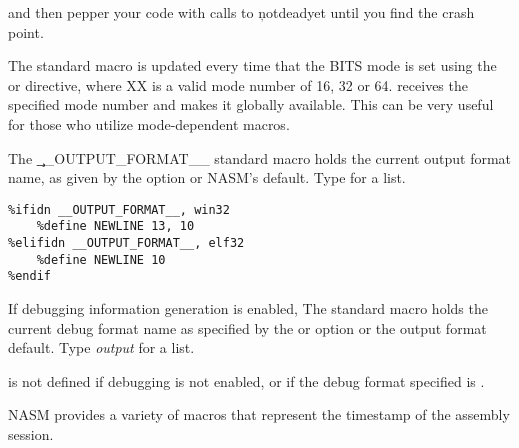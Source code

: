 and then pepper your code with calls to \c{notdeadyet} until you
find the crash point.


The  standard macro is updated every time that the BITS
mode is set using the  or \code{[BITS XX]} directive,
where XX is a valid mode number of 16, 32 or 64.  receives
the specified mode number and makes it globally available. This can be very
useful for those who utilize mode-dependent macros.


The \c{\_\_OUTPUT\_FORMAT\_\_} standard macro holds the current output
format name, as given by the  option or NASM's default. Type
 for a list.

\begin{lstlisting}
%ifidn __OUTPUT_FORMAT__, win32
    %define NEWLINE 13, 10
%elifidn __OUTPUT_FORMAT__, elf32
    %define NEWLINE 10
%endif
\end{lstlisting}


If debugging information generation is enabled, The
 standard macro holds the current
debug format name as specified by the  or  option
or the output format default. Type  \emph{output}
 for a list.

 is not defined if debugging is not
enabled, or if the debug format specified is .


NASM provides a variety of macros that represent the timestamp of the
assembly session.

